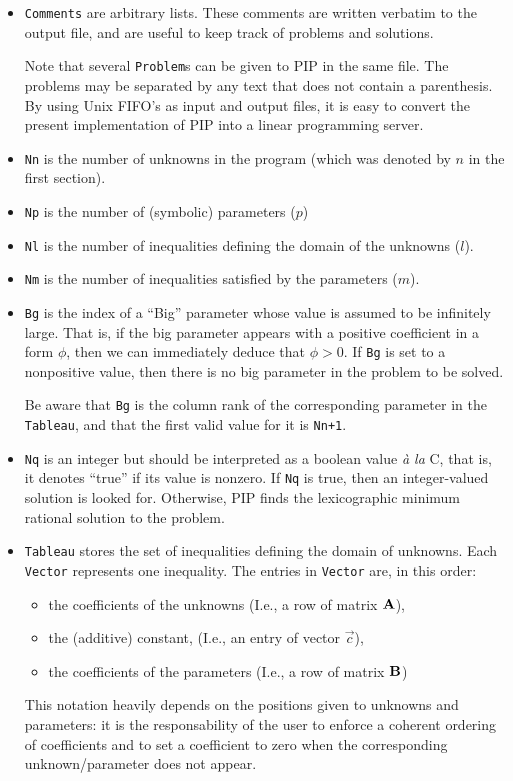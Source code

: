 \documentclass[12pt,a4paper]{article}
\begin{document}
\begin{itemize}
\item
{\tt Comments} are arbitrary lists. These comments are
written verbatim to the output file, and are useful to keep track of
problems and solutions.

Note that several {\tt Problem}s can be given to PIP in the same
file. The problems may be separated by any text that does not
contain a parenthesis. By using Unix FIFO's as input and output files,
it is easy to convert the present implementation of PIP into a
linear programming server.

\item
{\tt Nn} is the number of unknowns in the program (which was denoted
by $n$ in the first section).

\item {\tt Np} is the number of (symbolic) parameters ($p$)

\item {\tt Nl} is the number of inequalities defining the domain of the unknowns ($l$). 

\item {\tt Nm} is the number of inequalities satisfied by the parameters ($m$).

\item {\tt Bg} is the index of a  ``Big'' parameter whose value is assumed 
to be infinitely large. That is, if the big parameter appears with a
positive coefficient in a form $\phi$, then we can immediately deduce
that $\phi > 0$. If {\tt Bg} is set to a nonpositive
value, then there is no big parameter in the problem to be solved.

Be aware that {\tt Bg} is the column rank of the corresponding
parameter in the {\tt Tableau}, and that the first valid value for it
is {\tt Nn+1}.

\item {\tt Nq} is an integer but should be interpreted
 as a boolean value {\sl \`a la} 
C, that is, it denotes ``true'' if its value is nonzero. If {\tt Nq}
is true, then an integer-valued solution is looked for. Otherwise, PIP
finds the lexicographic minimum rational solution to the problem.

\item {\tt Tableau} stores the set of inequalities defining the domain 
of unknowns. Each {\tt Vector} represents one inequality. The entries
in {\tt Vector} are, in this order:
\begin{itemize}
\item the coefficients of the unknowns (I.e., a row of matrix ${\bf A}$),
\item the (additive) constant, (I.e., an entry of vector $\vec{c}$),
\item the coefficients of the parameters (I.e., a row of matrix ${\bf B}$)
\end{itemize}
This notation heavily depends on the positions given
to unknowns and parameters: it is the responsability of the user to
enforce a coherent ordering of coefficients and to set a coefficient
to zero when the corresponding unknown/parameter does not appear.


\end{itemize}
\end{document}
